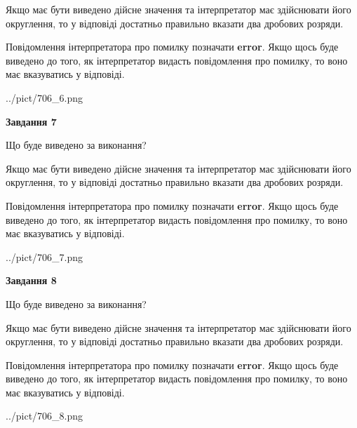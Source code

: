 \documentclass[12pt, ukrainian]{article}
\begin{document}
{\begin {Large}
Якщо має бути виведено дійсне значення та інтерпретатор має здійснювати його округлення, 
то у відповіді достатньо правильно вказати два дробових розряди.

Повідомлення інтерпретатора про помилку позначати \textbf{error}.
Якщо щось буде виведено до того, як інтерпретатор видасть повідомлення про помилку, 
то воно має вказуватись у відповіді. \par

\begin{center}
	{../pict/706_6.png}
\end{center}
\newpage

{\begin {center}\textbf{Завдання 7}\end {center}}\par
Що буде виведено за виконання? \par

Якщо має бути виведено дійсне значення та інтерпретатор має здійснювати його округлення, 
то у відповіді достатньо правильно вказати два дробових розряди.

Повідомлення інтерпретатора про помилку позначати \textbf{error}.
Якщо щось буде виведено до того, як інтерпретатор видасть повідомлення про помилку, 
то воно має вказуватись у відповіді. \par

\begin{center}
	{../pict/706_7.png}
\end{center}
\newpage

{\begin {center}\textbf{Завдання 8}\end {center}}\par
Що буде виведено за виконання? \par

Якщо має бути виведено дійсне значення та інтерпретатор має здійснювати його округлення, 
то у відповіді достатньо правильно вказати два дробових розряди.

Повідомлення інтерпретатора про помилку позначати \textbf{error}.
Якщо щось буде виведено до того, як інтерпретатор видасть повідомлення про помилку, 
то воно має вказуватись у відповіді. \par

\begin{center}
	{../pict/706_8.png}
\end{center}
\newpage


\end{Large}}
\end{document}
